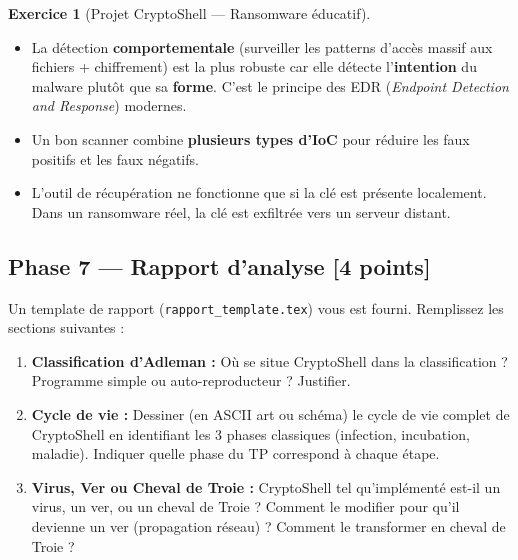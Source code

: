 \documentclass[a4paper,11pt]{article}
\theoremstyle{plain}
\theoremstyle{definition}
\newtheorem{exercice}{Exercice}
\begin{document}
\begin{exercice}[Projet CryptoShell --- Ransomware éducatif]
\begin{correction}
\begin{pointcle}
\begin{itemize}
    \item La détection \textbf{comportementale} (surveiller les patterns d'accès massif aux fichiers + chiffrement) est la plus robuste car elle détecte l'\textbf{intention} du malware plutôt que sa \textbf{forme}. C'est le principe des EDR (\textit{Endpoint Detection and Response}) modernes.
    \item Un bon scanner combine \textbf{plusieurs types d'IoC} pour réduire les faux positifs et les faux négatifs.
    \item L'outil de récupération ne fonctionne que si la clé est présente localement. Dans un ransomware réel, la clé est exfiltrée vers un serveur distant.
\end{itemize}
\end{pointcle}

\end{correction}



\subsection*{Phase 7 --- Rapport d'analyse \hfill \normalsize [4 points]}

\noindent Un template de rapport (\texttt{rapport\_template.tex}) vous est fourni. Remplissez les sections suivantes :

\begin{enumerate}
\item[\textbf{R1)}] \textbf{Classification d'Adleman :} Où se situe CryptoShell dans la classification ? Programme simple ou auto-reproducteur ? Justifier.

\item[\textbf{R2)}] \textbf{Cycle de vie :} Dessiner (en ASCII art ou schéma) le cycle de vie complet de CryptoShell en identifiant les 3 phases classiques (infection, incubation, maladie). Indiquer quelle phase du TP correspond à chaque étape.

\item[\textbf{R3)}] \textbf{Virus, Ver ou Cheval de Troie :} CryptoShell tel qu'implémenté est-il un virus, un ver, ou un cheval de Troie ? Comment le modifier pour qu'il devienne un ver (propagation réseau) ? Comment le transformer en cheval de Troie ?


\end{enumerate}
\end{exercice}
\end{document}
